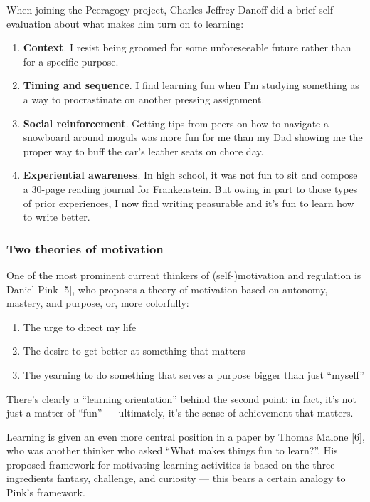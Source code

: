 When joining the Peeragogy project, Charles Jeffrey Danoff did a brief
self-evaluation about what makes him turn on to learning:

\begin{enumerate}
\item
  \textbf{Context}. I resist being groomed for some unforeseeable future
  rather than for a specific purpose.
\item
  \textbf{Timing and sequence}. I find learning fun when I'm studying
  something as a way to procrastinate on another pressing assignment.
\item
  \textbf{Social reinforcement}. Getting tips from peers on how to
  navigate a snowboard around moguls was more fun for me than my Dad
  showing me the proper way to buff the car's leather seats on chore
  day.
\item
  \textbf{Experiential awareness}. In high school, it was not fun to sit
  and compose a 30-page reading journal for Frankenstein. But owing in
  part to those types of prior experiences, I now find writing
  peasurable and it's fun to learn how to write better.
\end{enumerate}
\subsubsection{Two theories of motivation}

One of the most prominent current thinkers of (self-)motivation and
regulation is Daniel Pink {[}5{]}, who proposes a theory of motivation
based on autonomy, mastery, and purpose, or, more colorfully:

\begin{enumerate}
\item
  The urge to direct my life
\item
  The desire to get better at something that matters
\item
  The yearning to do something that serves a purpose bigger than just
  ``myself''
\end{enumerate}
There's clearly a ``learning orientation'' behind the second point: in
fact, it's not just a matter of ``fun'' --- ultimately, it's the sense
of achievement that matters.

Learning is given an even more central position in a paper by Thomas
Malone {[}6{]}, who was another thinker who asked ``What makes things
fun to learn?''. His proposed framework for motivating learning
activities is based on the three ingredients fantasy, challenge, and
curiosity --- this bears a certain analogy to Pink's framework.

